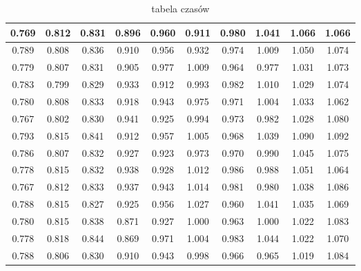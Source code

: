 \begin{table}[!ht]
\begin{tabular}{|c|c|c|c|c|c|c|c|c|c|}
      0.769 & 0.812 & 0.831 & 0.896 & 0.960 & 0.911 & 0.980 & 1.041 & 1.066 & 1.066 \\ \hline
      0.789 & 0.808 & 0.836 & 0.910 & 0.956 & 0.932 & 0.974 & 1.009 & 1.050 & 1.074 \\ \hline
      0.779 & 0.807 & 0.831 & 0.905 & 0.977 & 1.009 & 0.964 & 0.977 & 1.031 & 1.073 \\ \hline
      0.783 & 0.799 & 0.829 & 0.933 & 0.912 & 0.993 & 0.982 & 1.010 & 1.029 & 1.074 \\ \hline
      0.780 & 0.808 & 0.833 & 0.918 & 0.943 & 0.975 & 0.971 & 1.004 & 1.033 & 1.062 \\ \hline
      0.767 & 0.802 & 0.830 & 0.941 & 0.925 & 0.994 & 0.973 & 0.982 & 1.028 & 1.080 \\ \hline
      0.793 & 0.815 & 0.841 & 0.912 & 0.957 & 1.005 & 0.968 & 1.039 & 1.090 & 1.092 \\ \hline
      0.786 & 0.807 & 0.832 & 0.927 & 0.923 & 0.973 & 0.970 & 0.990 & 1.045 & 1.075 \\ \hline
      0.778 & 0.815 & 0.832 & 0.938 & 0.928 & 1.012 & 0.986 & 0.988 & 1.051 & 1.064 \\ \hline
      0.767 & 0.812 & 0.833 & 0.937 & 0.943 & 1.014 & 0.981 & 0.980 & 1.038 & 1.086 \\ \hline
      0.788 & 0.815 & 0.827 & 0.925 & 0.956 & 1.027 & 0.960 & 1.041 & 1.035 & 1.069 \\ \hline
      0.780 & 0.815 & 0.838 & 0.871 & 0.927 & 1.000 & 0.963 & 1.000 & 1.022 & 1.083 \\ \hline
      0.778 & 0.818 & 0.844 & 0.869 & 0.971 & 1.004 & 0.983 & 1.044 & 1.022 & 1.070 \\ \hline
      0.788 & 0.806 & 0.830 & 0.910 & 0.943 & 0.998 & 0.966 & 0.965 & 1.019 & 1.084 \\ \hline
    \end{tabular}
    \label{table_1}
    \caption{tabela czasów}
  \end{table}


